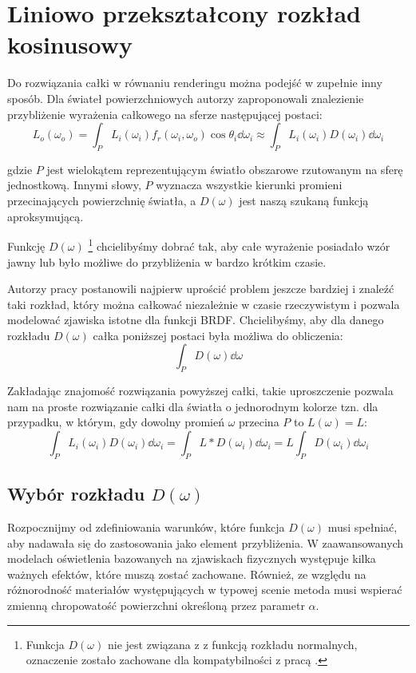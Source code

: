 \documentclass[../main.tex]{subfiles}
\begin{document}
\chapter{Liniowo przekształcony rozkład kosinusowy}
\label{Chapter:LTC}

Do rozwiązania całki w równaniu renderingu można podejść w zupełnie inny sposób. Dla świateł powierzchniowych autorzy \cite{ltc_heitz} zaproponowali znalezienie przybliżenie wyrażenia całkowego na sferze następującej postaci:
\[
L_o(\omega_o) = \int_{P} {
  L_i(\omega_i)
  f_r(\omega_i, \omega_o)
  \cos \theta_i
  \dd \omega_i
}
\approx
\int_{P} {
  L_i(\omega_i)
  D(\omega_i)
  \dd \omega_i
}
\]

\noindent gdzie $P$ jest wielokątem reprezentującym światło obszarowe rzutowanym na sferę jednostkową. Innymi słowy, $P$ wyznacza wszystkie kierunki promieni przecinających powierzchnię światła, a $D(\omega)$ jest naszą szukaną funkcją aproksymującą.

Funkcję $D(\omega)$ \footnote{Funkcja $D(\omega)$ nie jest związana z z funkcją rozkładu normalnych, oznaczenie zostało zachowane dla kompatybilności z pracą \cite{ltc_heitz}.} chcielibyśmy dobrać tak, aby całe wyrażenie posiadało wzór jawny lub było możliwe do przybliżenia w bardzo krótkim czasie.

Autorzy pracy \cite{ltc_heitz} postanowili najpierw uprościć problem jeszcze bardziej i znaleźć taki rozkład, który można całkować niezależnie w czasie rzeczywistym i pozwala modelować  zjawiska istotne dla funkcji BRDF. Chcielibyśmy, aby dla danego rozkładu $D(\omega)$ całka poniższej postaci była możliwa do obliczenia:
\[
\int_P {
    D(\omega)
    \dd \omega
}
\]

Zakładając znajomość rozwiązania powyższej całki, takie uproszczenie pozwala nam na proste rozwiązanie całki dla światła o jednorodnym kolorze tzn. dla przypadku, w którym, gdy dowolny promień $\omega$ przecina $P$ to $L(\omega)=L$:
\[
\int_{P} {
    L_i(\omega_i)
    D(\omega_i)
    \dd \omega_i
} = \int_{P} {
    L *
    D(\omega_i)
    \dd \omega_i
} = L \int_{P} {
    D(\omega_i)
    \dd \omega_i
}
\]

\section{Wybór rozkładu $D(\omega)$}

Rozpocznijmy od zdefiniowania warunków, które funkcja $D(\omega)$ musi spełniać, aby nadawała się do zastosowania jako element przybliżenia. W zaawansowanych modelach oświetlenia bazowanych na zjawiskach fizycznych występuje kilka ważnych efektów, które muszą zostać zachowane. Również, ze względu na różnorodność materiałów występujących w typowej scenie metoda musi wspierać zmienną chropowatość powierzchni określoną przez parametr $\alpha$.
\end{document}
